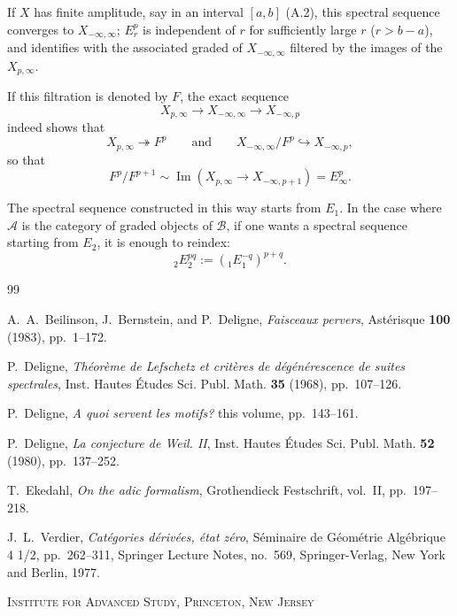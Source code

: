 \documentclass[11pt,a4paper]{article}
\theoremstyle{plain}
\theoremstyle{definition}
\theoremstyle{remark}
\newcommand{\cA}{\mathscr{A}}
\newcommand{\cB}{\mathscr{B}}
\begin{document}
If $X$ has finite amplitude, say in an interval $[a,b]$ (A.2), this spectral sequence converges to $X_{-\infty,\infty}$; $E_r^p$ is independent of $r$ for sufficiently large $r$ ($r>b-a$), and identifies with the associated graded of $X_{-\infty,\infty}$ filtered by the images of the $X_{p,\infty}$.

If this filtration is denoted by $F$, the exact sequence
\[
X_{p,\infty}\to X_{-\infty,\infty}\to X_{-\infty,p}
\]
indeed shows that
\[
X_{p,\infty}\twoheadrightarrow F^p\qquad\text{and}\qquad X_{-\infty,\infty}/F^p\hookrightarrow X_{-\infty,p},
\]
so that
\[
F^p/F^{p+1}\sim \operatorname{Im}(X_{p,\infty}\to X_{-\infty,p+1})=E_\infty^p.
\]

The spectral sequence constructed in this way starts from $E_1$. In the case where $\cA$ is the category of graded objects of $\cB$, if one wants a spectral sequence starting from $E_2$, it is enough to reindex:
\[
{}_2\!E_2^{pq}:=({}_1\!E_1^{-q})^{p+q}.
\]

\begin{thebibliography}{99}

A.~A.~Beilinson, J.~Bernstein, and P.~Deligne, \textit{Faisceaux pervers}, Ast\'erisque {\bf 100} (1983), pp.~1--172.

P.~Deligne, \textit{Th\'eor\`eme de Lefschetz et crit\`eres de d\'eg\'en\'erescence de suites spectrales}, Inst. Hautes \'Etudes Sci. Publ. Math. {\bf 35} (1968), pp.~107--126.

P.~Deligne, \textit{A quoi servent les motifs?} this volume, pp.~143--161.

P.~Deligne, \textit{La conjecture de Weil. II}, Inst. Hautes \'Etudes Sci. Publ. Math. {\bf 52} (1980), pp.~137--252.

T.~Ekedahl, \textit{On the adic formalism}, Grothendieck Festschrift, vol.~II, pp.~197--218.

J.~L.~Verdier, \textit{Cat\'egories d\'eriv\'ees, \'etat z\'ero}, S\'eminaire de G\'eom\'etrie Alg\'ebrique 4 1/2, pp.~262--311, Springer Lecture Notes, no.~569, Springer-Verlag, New York and Berlin, 1977.

\end{thebibliography}

\medskip
\noindent\textsc{Institute for Advanced Study, Princeton, New Jersey}
\end{document}
